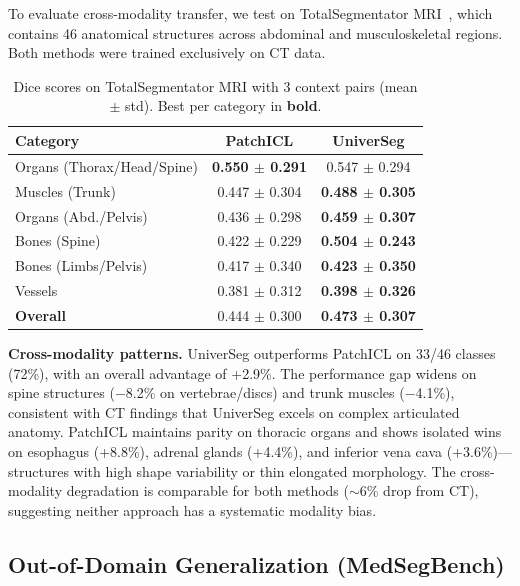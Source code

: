 \documentclass[runningheads]{llncs}
\begin{document}
To evaluate cross-modality transfer, we test on TotalSegmentator MRI~\cite{dantonoliTotalSegmentatorMRIRobust2025}, which contains 46 anatomical structures across abdominal and musculoskeletal regions. Both methods 
were trained exclusively on CT data.

\begin{table}[t]
\centering
\caption{Dice scores on TotalSegmentator MRI with 3 context pairs (mean $\pm$ std). Best per category in \textbf{bold}.}\label{tab:dice_totalseg_mri}
\begin{tabular}{lcc}
\toprule
Category & PatchICL & UniverSeg \\
\midrule
Organs (Thorax/Head/Spine)   & \textbf{0.550 $\pm$ 0.291} & 0.547 $\pm$ 0.294 \\
Muscles (Trunk)              & 0.447 $\pm$ 0.304 & \textbf{0.488 $\pm$ 0.305} \\
Organs (Abd./Pelvis)         & 0.436 $\pm$ 0.298 & \textbf{0.459 $\pm$ 0.307} \\
Bones (Spine)                & 0.422 $\pm$ 0.229 & \textbf{0.504 $\pm$ 0.243} \\
Bones (Limbs/Pelvis)         & 0.417 $\pm$ 0.340 & \textbf{0.423 $\pm$ 0.350} \\
Vessels                      & 0.381 $\pm$ 0.312 & \textbf{0.398 $\pm$ 0.326} \\
\midrule
\textbf{Overall}             & 0.444 $\pm$ 0.300 & \textbf{0.473 $\pm$ 0.307} \\
\bottomrule
\end{tabular}
\end{table}

\textbf{Cross-modality patterns.} UniverSeg outperforms PatchICL on 33/46 classes (72\%), with an overall advantage of +2.9\%. The performance gap widens on spine structures ($-$8.2\% on vertebrae/discs) and trunk
muscles ($-$4.1\%), consistent with CT findings that UniverSeg excels on complex articulated anatomy. PatchICL maintains parity on thoracic organs and shows isolated wins on esophagus (+8.8\%), adrenal glands
(+4.4\%), and inferior vena cava (+3.6\%)---structures with high shape variability or thin elongated morphology. The cross-modality degradation is comparable for both methods ($\sim$6\% drop from CT), suggesting
neither approach has a systematic modality bias.

\subsection{Out-of-Domain Generalization (MedSegBench)}
\end{document}
